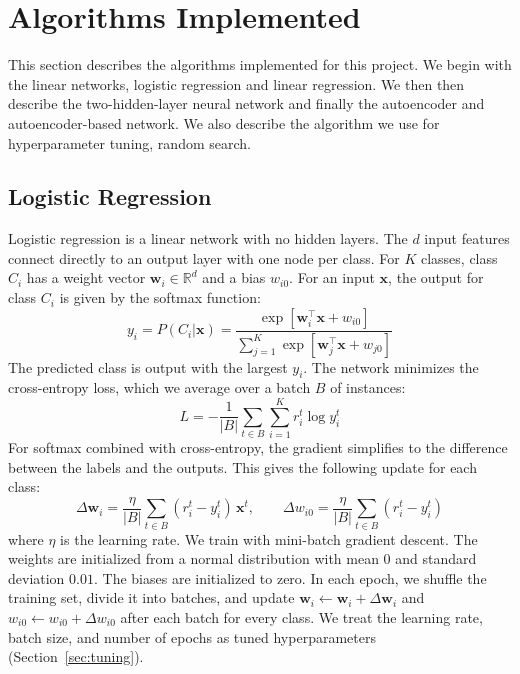 \documentclass[twoside,11pt]{article}
\begin{document}
\section{Algorithms Implemented}
This section describes the algorithms implemented for this project. We begin with the linear networks, logistic regression and linear regression. We then then describe the two-hidden-layer neural network and finally the autoencoder and autoencoder-based network. We also describe the algorithm we use for hyperparameter tuning, random search.

\subsection{Logistic Regression}
Logistic regression is a linear network with no hidden layers. The $d$ input features connect directly to an output layer with one node per class. For $K$ classes, class $C_i$ has a weight vector $\mathbf{w}_i \in \mathbb{R}^{d}$ and a bias $w_{i0}$. For an input $\mathbf{x}$, the output for class $C_i$ is given by the softmax function:
\begin{equation}
    y_i = P(C_i|\mathbf{x}) = \frac{\exp\left[\mathbf{w}_i^{\top}\mathbf{x} + w_{i0}\right]}{\sum_{j=1}^{K}\exp\left[\mathbf{w}_j^{\top}\mathbf{x} + w_{j0}\right]}
\end{equation}
The predicted class is output with the largest $y_i$. The network minimizes the cross-entropy loss, which we average over a batch $B$ of instances:
\begin{equation}
    L = -\frac{1}{|B|}\sum_{t \in B}\sum_{i=1}^{K} r_i^t \log y_i^t
\end{equation}
For softmax combined with cross-entropy, the gradient simplifies to the difference between the labels and the outputs. This gives the following update for each class:
\begin{equation}
    \Delta\mathbf{w}_i = \frac{\eta}{|B|}\sum_{t \in B}(r_i^t - y_i^t)\,\mathbf{x}^t, \qquad
    \Delta w_{i0} = \frac{\eta}{|B|}\sum_{t \in B}(r_i^t - y_i^t)
\end{equation}
where $\eta$ is the learning rate. We train with mini-batch gradient descent. The weights are initialized from a normal distribution with mean $0$ and standard deviation $0.01$. The biases are initialized to zero. In each epoch, we shuffle the training set, divide it into batches, and update $\mathbf{w}_i \leftarrow \mathbf{w}_i + \Delta\mathbf{w}_i$ and $w_{i0} \leftarrow w_{i0} + \Delta w_{i0}$ after each batch for every class. We treat the learning rate, batch size, and number of epochs as tuned hyperparameters (Section~\ref{sec:tuning}).
\end{document}
